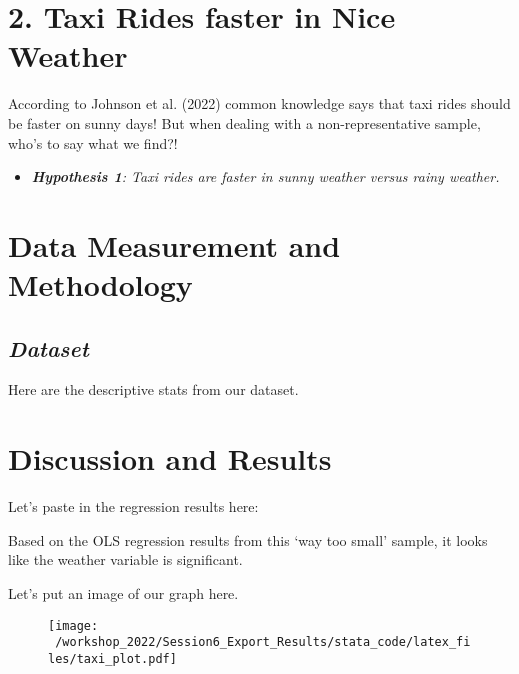 \documentclass[11pt]{article}
\begin{document}
\section*{2. Taxi Rides faster in Nice Weather}

According to Johnson et al. (2022) common knowledge says that taxi rides should be faster on sunny days!  But when dealing with a non-representative sample, who's to say what we find?!

\begin{itemize}
\item[] \emph{{\bf Hypothesis 1}: Taxi rides are faster in sunny weather versus rainy weather.} 
\end{itemize}

\section*{Data Measurement and Methodology}

 \subsection*{\emph{Dataset}}
Here are the descriptive stats from our dataset. 

\begin{center}
%
%

\end{center}

\section*{Discussion and Results}

Let's paste in the regression results here: 

\begin{center}
%
%

\end{center}

Based on the OLS regression results from this `way too small' sample, it looks like the weather variable is significant.  
\newpage

Let's put an image of our graph here.  
\begin{figure}[!htbp]
\centering
\texttt{[image: ~/workshop\_2022/Session6\_Export\_Results/stata\_code/latex\_files/taxi\_plot.pdf]}
\end{figure}
\end{document}
